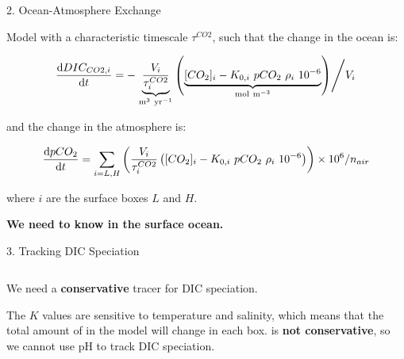 \documentclass[aspectratio=169]{beamer}
\begin{document}
\begin{frame}{2. Ocean-Atmosphere Exchange}

    Model with a characteristic timescale $\tau^{CO2}$, such that the change in the ocean is:

    $$
    \frac{\mathrm{d}DIC_{CO2,i}}{\mathrm{d}t} = - \left. \underbrace{\frac{V_i}{\tau^{CO2}_i}}_{\mathrm{m^3~yr^{-1}}} \left( \underbrace{[CO_2]_i - K_{0,i} ~ pCO_2 ~ \rho_i ~ 10^{-6}}_{\mathrm{mol~m^{-3}}} \right) \middle/ V_i \right.
    $$

    and the change in the atmosphere is:

    $$
    \frac{\mathrm{d}pCO_2}{\mathrm{d}t} = \sum_{i=L,H} \left(\frac{V_i}{\tau^{CO2}_i} \left([CO_2]_i - K_{0,i} ~ pCO_2 ~ \rho_i ~ 10^{-6} \right) \right) \times 10^{6} / n_{air}
    $$

    where $i$ are the surface boxes $L$ and $H$.
    
    \bigskip
    \textbf{We need to know \ce{[CO_2^*]} in the surface ocean.}

\end{frame}

\begin{frame}{3. Tracking DIC Speciation}

    \begin{columns}
        \begin{column}{0.5\linewidth}
            We need a \textbf{conservative} tracer for DIC speciation.
            \bigskip
        
            The $K$ values are sensitive to temperature and salinity, which means that the total amount of  in the model will change in each box. \ce{[H+]} is \textbf{not conservative}, so we cannot use pH to track DIC speciation.
            \bigskip
        \end{column}


    \end{columns}

\end{frame}
\end{document}
